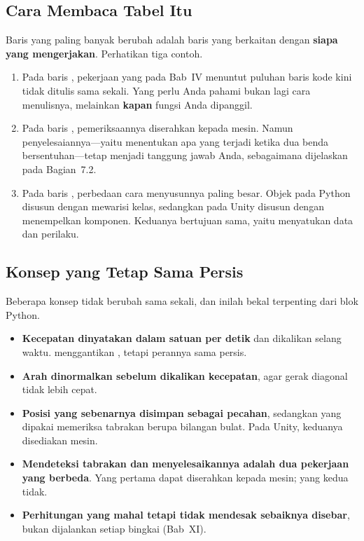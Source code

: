 \subsection{Cara Membaca Tabel Itu}

Baris yang paling banyak berubah adalah baris yang berkaitan dengan
\textbf{siapa yang mengerjakan}. Perhatikan tiga contoh.

\begin{enumerate}
  \item Pada baris , pekerjaan yang pada Bab~IV
        menuntut puluhan baris kode kini tidak ditulis sama sekali. Yang perlu
        Anda pahami bukan lagi cara menulisnya, melainkan \textbf{kapan} fungsi
        Anda dipanggil.
  \item Pada baris , pemeriksaannya diserahkan kepada mesin.
        Namun penyelesaiannya---yaitu menentukan apa yang terjadi ketika dua
        benda bersentuhan---tetap menjadi tanggung jawab Anda, sebagaimana
        dijelaskan pada Bagian~7.2.
  \item Pada baris , perbedaan cara menyusunnya paling
        besar. Objek pada Python disusun dengan mewarisi kelas, sedangkan
         pada Unity disusun dengan menempelkan komponen.
        Keduanya bertujuan sama, yaitu menyatukan data dan perilaku.
\end{enumerate}

\subsection{Konsep yang Tetap Sama Persis}

Beberapa konsep tidak berubah sama sekali, dan inilah bekal terpenting dari blok
Python.

\begin{itemize}
  \item \textbf{Kecepatan dinyatakan dalam satuan per detik} dan dikalikan
        selang waktu.  menggantikan
        , tetapi perannya sama persis.
  \item \textbf{Arah dinormalkan sebelum dikalikan kecepatan}, agar gerak
        diagonal tidak lebih cepat.
  \item \textbf{Posisi yang sebenarnya disimpan sebagai pecahan}, sedangkan
        yang dipakai memeriksa tabrakan berupa bilangan bulat. Pada Unity,
        keduanya disediakan mesin.
  \item \textbf{Mendeteksi tabrakan dan menyelesaikannya adalah dua pekerjaan
        yang berbeda}. Yang pertama dapat diserahkan kepada mesin; yang kedua
        tidak.
  \item \textbf{Perhitungan yang mahal tetapi tidak mendesak sebaiknya
        disebar}, bukan dijalankan setiap bingkai (Bab~XI).
\end{itemize}

